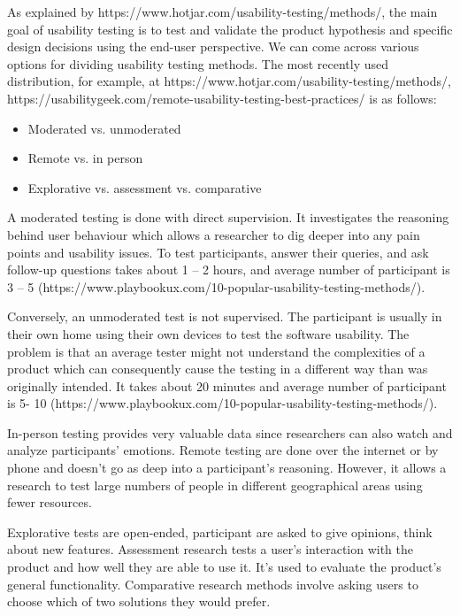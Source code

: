\documentclass[a4paper,10pt,twoside]{article}
\begin{document}
As explained by https://www.hotjar.com/usability-testing/methods/, the main goal of usability testing is to test and validate the product hypothesis and specific design decisions using the end-user perspective. We can come across various options for dividing usability testing methods. The most recently used distribution, for example, at https://www.hotjar.com/usability-testing/methods/, https://usabilitygeek.com/remote-usability-testing-best-practices/ is as follows:

\begin{itemize}
\item	Moderated vs. unmoderated
\item	Remote vs. in person
\item	Explorative vs. assessment vs. comparative
\end{itemize}

\noindent A moderated testing is done with direct supervision. It investigates the reasoning behind user behaviour which allows a researcher to dig deeper into any pain points and usability issues. To test participants, answer their queries, and ask follow-up questions takes about 1 – 2 hours, and average number of participant is 3 – 5 (https://www.playbookux.com/10-popular-usability-testing-methods/). 

Conversely, an unmoderated test is not supervised. The participant is usually in their own home using their own devices to test the software usability. The problem is that an average tester might not understand the complexities of a product which can consequently cause the testing in a different way than was originally intended. It takes about 20 minutes and average number of participant is 5- 10 (https://www.playbookux.com/10-popular-usability-testing-methods/).

In-person testing provides very valuable data since researchers can also watch and analyze participants’ emotions. 
Remote testing are done over the internet or by phone and doesn’t go as deep into a participant’s reasoning. However, it allows a research to test large numbers of people in different geographical areas using fewer resources.

\noindent Explorative tests are open-ended, participant are asked to give opinions, think about new features. Assessment research tests a user's interaction with the product and how well they are able to use it.  It's used to evaluate the product's general functionality. Comparative research methods involve asking users to choose which of two solutions they would prefer.
\end{document}
